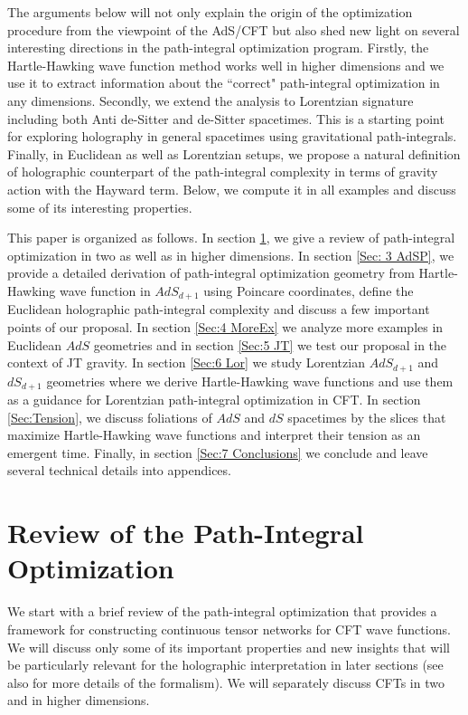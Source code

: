 \documentclass[a4paper,12pt]{article}
\begin{document}
The arguments below will not only explain the origin of the optimization procedure from the viewpoint of the AdS/CFT but also shed new light on several interesting directions in the path-integral optimization program. Firstly, the Hartle-Hawking wave function method works well in higher dimensions and we use it to extract information about the ``correct" path-integral optimization in any dimensions. Secondly, we extend the analysis to Lorentzian signature including both Anti de-Sitter and de-Sitter spacetimes. This is a starting point for exploring holography in general spacetimes using gravitational path-integrals. Finally, in Euclidean as well as Lorentzian setups, we propose a natural definition of holographic counterpart of the path-integral complexity in terms of gravity action with the Hayward term. Below, we compute it in all examples and discuss some of its interesting properties.

This paper is organized as follows. In section \ref{Sec:2 Review}, we give a review of path-integral optimization in two as well as in higher dimensions. In section \ref{Sec: 3 AdSP}, we provide a detailed derivation of path-integral optimization geometry from Hartle-Hawking wave function in $AdS_{d+1}$ using Poincare coordinates, define the Euclidean holographic path-integral complexity and discuss a few important points of our proposal. In section \ref{Sec:4 MoreEx} we analyze more examples in Euclidean $AdS$ geometries and in section \ref{Sec:5 JT} we test our proposal in the context of JT gravity. In section \ref{Sec:6 Lor} we study Lorentzian $AdS_{d+1}$ and $dS_{d+1}$ geometries where we derive Hartle-Hawking wave functions and use them as a guidance for Lorentzian path-integral optimization in CFT. 
In section \ref{Sec:Tension}, we discuss foliations of $AdS$ and $dS$ spacetimes by the slices that maximize Hartle-Hawking wave functions and interpret their tension as an emergent time. Finally, in section \ref{Sec:7 Conclusions} we conclude and leave several technical details into appendices.

\section{Review of the Path-Integral Optimization}\label{Sec:2 Review}
We start with a brief review of the path-integral optimization \cite{Caputa:2017urj} that provides a framework for constructing continuous tensor networks for CFT wave functions. We will discuss only some of its important properties and new insights that will be particularly relevant for the holographic interpretation in later sections (see also \cite{MTW,Bhattacharyya:2018wym,Caputa:2020mgb,Takayanagi:2018pml} for more details of the formalism). We will separately discuss CFTs in two and in higher dimensions. 
\end{document}

